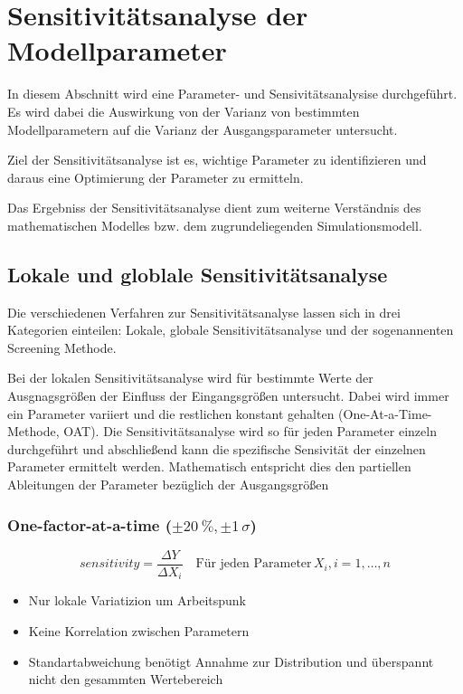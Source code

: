 \pagestyle{milan}
\section{Sensitivitätsanalyse der Modellparameter}\label{sec:sesitivitaetsanalyse}
In diesem Abschnitt wird eine Parameter- und Sensivitätsanalysise durchgeführt. 
Es wird dabei die Auswirkung von der Varianz von bestimmten Modellparametern auf die Varianz der Ausgangsparameter untersucht.

Ziel der Sensitivitätsanalyse ist es, wichtige Parameter zu identifizieren und daraus eine Optimierung der Parameter zu ermitteln.

Das Ergebniss der Sensitivitätsanalyse dient zum weiterne Verständnis des mathematischen Modelles bzw. dem zugrundeliegenden Simulationsmodell.
\subsection{Lokale und globlale Sensitivitätsanalyse}

Die verschiedenen Verfahren zur Sensitivitätsanalyse lassen sich in drei Kategorien einteilen: Lokale, globale Sensitivitätsanalyse und der sogenannenten Screening Methode.

Bei der lokalen Sensitivitätsanalyse wird für bestimmte Werte der Ausgnagsgrößen der Einfluss der Eingangsgrößen untersucht. Dabei wird immer ein Parameter variiert und die restlichen konstant gehalten (One-At-a-Time-Methode, OAT).
Die Sensitivitätsanalyse wird so für jeden Parameter einzeln durchgeführt und abschließend kann die spezifische Sensivität der einzelnen Parameter ermittelt werden.
Mathematisch entspricht dies den partiellen Ableitungen der Parameter bezüglich der Ausgangsgrößen

\subsubsection*{One-factor-at-a-time ($\pm \SI{20}{\percent}, \pm 1\, \sigma$)}

\begin{equation}
    sensitivity=\frac{\Delta Y}{\Delta X_{i}} \quad \textrm{Für jeden Parameter}\,X_i, i=1,\dots,n
\end{equation}
\begin{itemize}
    \item Nur lokale Variatizion um Arbeitspunk 
    \item Keine Korrelation zwischen Parametern
    \item Standartabweichung benötigt Annahme zur Distribution und überspannt nicht den gesammten Wertebereich
\end{itemize}

